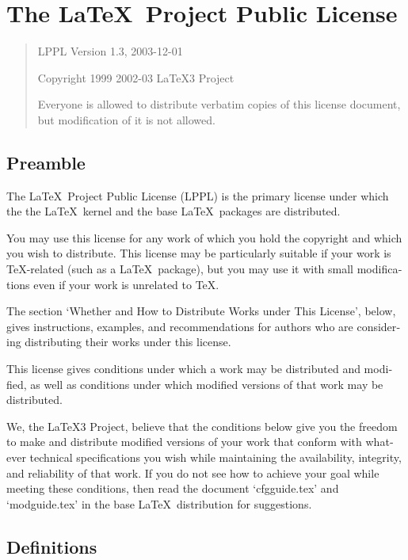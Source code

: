 \chapter{The \LaTeX\ Project Public License}\label{ch:LPPL}
\begin{otherlanguage}{english}
\begin{quote}
LPPL Version 1.3,  2003-12-01

Copyright 1999 2002-03 \LaTeX3 Project

    Everyone is allowed to distribute verbatim copies of this
    license document, but modification of it is not allowed.
\end{quote}

\section{Preamble}

The \LaTeX\ Project Public License (LPPL) is the primary license under
which the the \LaTeX\ kernel and the base \LaTeX\ packages are
distributed.

You may use this license for any work of which you hold the copyright
and which you wish to distribute.  This license may be particularly
suitable if your work is \TeX-related (such as a \LaTeX\ package), but
you may use it with small modifications even if your work is unrelated
to \TeX.

The section `Whether and How to Distribute Works under This License',
below, gives instructions, examples, and recommendations for authors
who are considering distributing their works under this license.

This license gives conditions under which a work may be distributed
and modified, as well as conditions under which modified versions of
that work may be distributed.

We, the \LaTeX3 Project, believe that the conditions below give you the
freedom to make and distribute modified versions of your work that
conform with whatever technical specifications you wish while
maintaining the availability, integrity, and reliability of that work.
If you do not see how to achieve your goal while meeting these
conditions, then read the document `cfgguide.tex' and `modguide.tex' in
the base \LaTeX\ distribution for suggestions.


\section{Definitions}


\end{otherlanguage}
